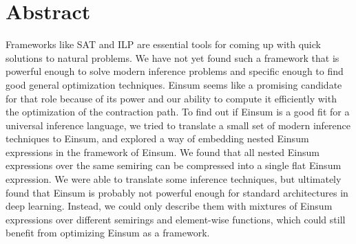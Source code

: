 \chapter{Abstract}

Frameworks like SAT and ILP are essential tools for coming up with quick solutions to natural problems.
We have not yet found such a framework that is powerful enough to solve modern inference problems
and specific enough to find good general optimization techniques.
Einsum seems like a promising candidate for that role because of its power and our ability to compute it efficiently with the optimization of the contraction path.
To find out if Einsum is a good fit for a universal inference language,
we tried to translate a small set of modern inference techniques to Einsum,
and explored a way of embedding nested Einsum expressions in the framework of Einsum.
We found that all nested Einsum expressions over the same semiring can be compressed into a single flat Einsum expression.
We were able to translate some inference techniques, but ultimately found that Einsum is probably not powerful enough for standard architectures in deep learning.
Instead, we could only describe them with mixtures of Einsum expressions over different semirings and element-wise functions, which could still benefit from optimizing Einsum as a framework.
